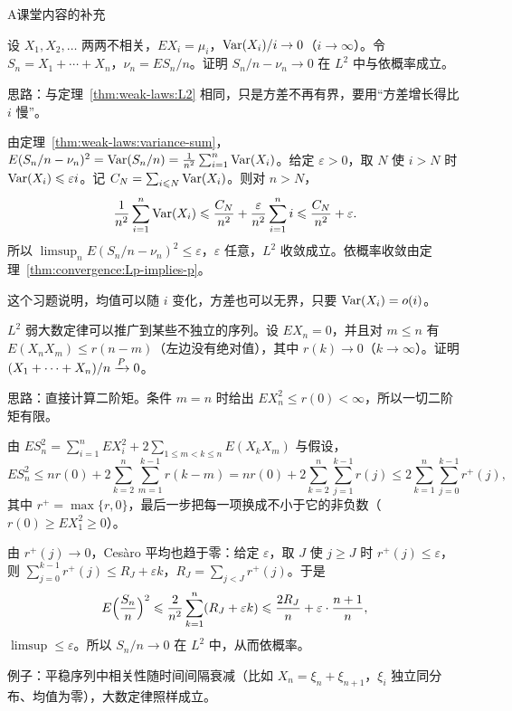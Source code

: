 \begin{exercises}{A}{课堂内容的补充}
\item\label{ex:weak-laws:A1} 设 $X_1,X_2,\dots$ 两两不相关，$EX_i=\mu_i$，$\operatorname{Var}(X_i)/i\to0$（$i\to\infty$）。令 $S_n=X_1+\cdots+X_n$，$\nu_n=ES_n/n$。证明 $S_n/n-\nu_n\to0$ 在 $L^2$ 中与依概率成立。
\begin{solution}
思路：与定理~\ref{thm:weak-laws:L2} 相同，只是方差不再有界，要用“方差增长得比 $i$ 慢”。

由定理~\ref{thm:weak-laws:variance-sum}，$E(S_n/n-\nu_n)^2=\operatorname{Var}(S_n/n)=\frac1{n^2}\sum_{i=1}^n\operatorname{Var}(X_i)$。给定 $\varepsilon>0$，取 $N$ 使 $i>N$ 时 $\operatorname{Var}(X_i)\leqslant\varepsilon i$。记 $C_N=\sum_{i\leqslant N}\operatorname{Var}(X_i)$。则对 $n>N$，
\[
\frac1{n^2}\sum_{i=1}^n\operatorname{Var}(X_i)\leqslant\frac{C_N}{n^2}+\frac\varepsilon{n^2}\sum_{i=1}^ni\leqslant\frac{C_N}{n^2}+\varepsilon .
\]
所以 $\limsup_nE(S_n/n-\nu_n)^2\leqslant\varepsilon$，$\varepsilon$ 任意，$L^2$ 收敛成立。依概率收敛由定理~\ref{thm:convergence:Lp-implies-p}。

这个习题说明，均值可以随 $i$ 变化，方差也可以无界，只要 $\operatorname{Var}(X_i)=o(i)$。
\end{solution}

\item\label{ex:weak-laws:A2} $L^2$ 弱大数定律可以推广到某些不独立的序列。设 $EX_n=0$，并且对 $m\leqslant n$ 有 $E(X_nX_m)\leqslant r(n-m)$（左边没有绝对值），其中 $r(k)\to0$（$k\to\infty$）。证明 $(X_1+\cdots+X_n)/n\xrightarrow{P}0$。
\begin{solution}
思路：直接计算二阶矩。条件 $m=n$ 时给出 $EX_n^2\leqslant r(0)<\infty$，所以一切二阶矩有限。

由 $ES_n^2=\sum_{i=1}^nEX_i^2+2\sum_{1\leqslant m<k\leqslant n}E(X_kX_m)$ 与假设，
\[
ES_n^2\leqslant nr(0)+2\sum_{k=2}^n\sum_{m=1}^{k-1}r(k-m)=nr(0)+2\sum_{k=2}^n\sum_{j=1}^{k-1}r(j)\leqslant2\sum_{k=1}^n\sum_{j=0}^{k-1}r^+(j),
\]
其中 $r^+=\max\{r,0\}$，最后一步把每一项换成不小于它的非负数（$r(0)\geqslant EX_1^2\geqslant0$）。

由 $r^+(j)\to0$，Cesàro 平均也趋于零：给定 $\varepsilon$，取 $J$ 使 $j\geqslant J$ 时 $r^+(j)\leqslant\varepsilon$，则 $\sum_{j=0}^{k-1}r^+(j)\leqslant R_J+\varepsilon k$，$R_J=\sum_{j<J}r^+(j)$。于是
\[
E\Bigl(\frac{S_n}n\Bigr)^2\leqslant\frac2{n^2}\sum_{k=1}^n(R_J+\varepsilon k)\leqslant\frac{2R_J}n+\varepsilon\cdot\frac{n+1}n,
\]
$\limsup\leqslant\varepsilon$。所以 $S_n/n\to0$ 在 $L^2$ 中，从而依概率。

例子：平稳序列中相关性随时间间隔衰减（比如 $X_n=\xi_n+\xi_{n+1}$，$\xi_i$ 独立同分布、均值为零），大数定律照样成立。
\end{solution}


\end{exercises}
